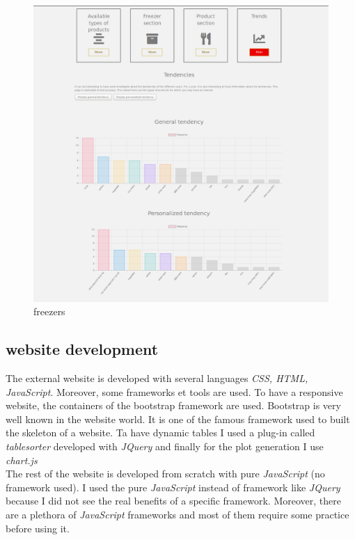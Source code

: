 \begin{figure}[H]
\centering
\includegraphics[scale=0.35]{./images/dashboard_trends.png}
\caption{freezers}
\label{fig:dashboard_trends}
\end{figure}

\subsection{website development}
The external website is developed with several languages \textit{CSS, HTML, JavaScript}. Moreover, some frameworks et tools are used. To have a responsive website, the containers of the bootstrap framework are used. Bootstrap is very well known in the website world. It is one of the famous framework used to built the skeleton of a website. Ta have dynamic tables I used a plug-in called \textit{tablesorter} developed with \textit{JQuery} and finally for the plot generation I use \textit{chart.js} \\

The rest of the website is developed from scratch with pure \textit{JavaScript} (no framework used). I used the pure \textit{JavaScript} instead of framework like \textit{JQuery} because I did not see the real benefits of a specific framework. Moreover, there are a plethora of \textit{JavaScript} frameworks and most of them require some practice before using it.\\

